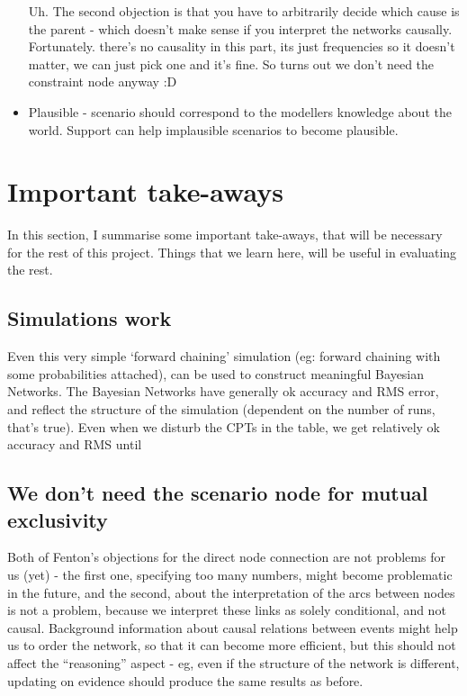 \begin{itemize}
Uh. The second objection is that you have to arbitrarily decide which cause is the parent - which doesn't make sense if you interpret the networks causally. Fortunately. there's no causality in this part, its just frequencies so it doesn't matter, we can just pick one and it's fine. So turns out we don't need the constraint node anyway :D

\item Plausible - scenario should correspond to the modellers knowledge about the world. Support can help implausible scenarios to become plausible.


\end{itemize}




\section{Important take-aways}
In this section, I summarise some important take-aways, that will be necessary for the rest of this project. Things that we learn here, will be useful in evaluating the rest.

\subsection{Simulations work}
Even this very simple `forward chaining' simulation (eg: forward chaining with some probabilities attached), can be used to construct meaningful Bayesian Networks. The Bayesian Networks have generally ok accuracy and RMS error, and reflect the structure of the simulation (dependent on the number of runs, that's true). Even when we disturb the CPTs in the table, we get relatively ok accuracy and RMS until  


\subsection{We don't need the scenario node for mutual exclusivity}
Both of Fenton's objections for the direct node connection are not problems for us (yet) - the first one, specifying too many numbers, might become problematic in the future, and the second, about the interpretation of the arcs between nodes is not a problem, because we interpret these links as solely conditional, and not causal. Background information about causal relations between events might help us to order the network, so that it can become more efficient, but this should not affect the ``reasoning'' aspect - eg, even if the structure of the network is different, updating on evidence should produce the same results as before.


